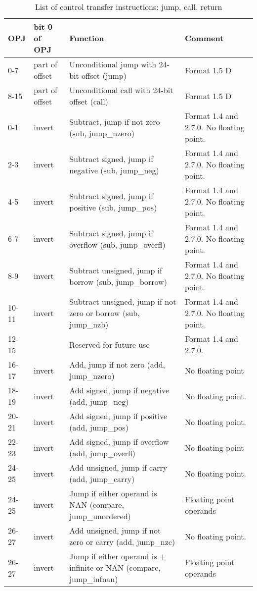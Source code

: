 \documentclass[forwardcom.tex]{subfiles}
\begin{document}
\begin{longtable}
{|p{10mm}|p{11mm}|p{50mm}|p{35mm}|}
\caption{List of control transfer instructions: jump, call, return}
\label{table:controlTransferInstructions}
\endfirsthead
\endhead
\hline
OPJ & bit 0 \newline of OPJ & Function & Comment \\
\hline
0-7 & part of offset & Unconditional jump with 24-bit offset (jump) & Format 1.5 D \\
\hline
8-15 & part of offset & Unconditional call with 24-bit offset (call) & Format 1.5 D \\
\hline
0-1 & invert & Subtract, jump if not zero (sub, jump\_nzero) & Format 1.4 and 2.7.0. No floating point. \\
\hline
2-3 & invert & Subtract signed, jump if negative (sub, jump\_neg) & Format 1.4 and 
    2.7.0. No floating point. \\
\hline
4-5 & invert & Subtract signed, jump if positive (sub, jump\_pos) & Format 1.4 and 2.7.0.
    No floating point. \\
\hline
6-7 & invert & Subtract signed, jump if overflow (sub, jump\_overfl) & Format 1.4 and 2.7.0. No floating point. \\
\hline
8-9 & invert & Subtract unsigned, jump if borrow (sub, jump\_borrow) & Format 1.4 and 2.7.0. No floating point. \\
\hline
10-11 & invert & Subtract unsigned, jump if not zero or borrow (sub, jump\_nzb) & Format 1.4 and 2.7.0. No floating point. \\
\hline

12-15 & & Reserved for future use & Format 1.4 and 2.7.0. \\
\hline

16-17 & invert & Add, jump if not zero (add, jump\_nzero) & No floating point \\
\hline
18-19 & invert & Add signed, jump if negative (add, jump\_neg) & No floating point. \\
\hline
20-21 & invert & Add signed, jump if positive (add, jump\_pos) & No floating point. \\
\hline
22-23 & invert & Add signed, jump if overflow (add, jump\_overfl) & No floating point  \\
\hline
24-25 & invert & Add unsigned, jump if carry (add, jump\_carry) & No floating point. \\
\hline
24-25 & invert & Jump if either operand is NAN (compare, jump\_unordered) & Floating point operands \\
\hline
26-27 & invert & Add unsigned, jump if not zero or carry (add, jump\_nzc) & No floating point. \\
\hline
26-27 & invert & Jump if either operand is $\pm$ infinite or NAN (compare, jump\_infnan) & Floating point operands \\
\hline


\end{longtable}
\end{document}
